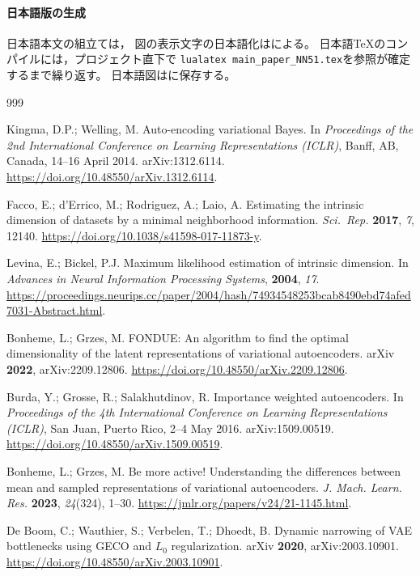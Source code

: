 \documentclass[11pt,a4paper]{ltjsarticle}
\begin{document}
\paragraph{日本語版の生成}
日本語本文の組立ては，
図の表示文字の日本語化はによる。
日本語TeXのコンパイルには，プロジェクト直下で
\texttt{lualatex main\_paper\_NN51.tex}を参照が確定するまで繰り返す。
日本語図はに保存する。


\begin{thebibliography}{999}

Kingma, D.P.; Welling, M.
Auto-encoding variational Bayes.
In \textit{Proceedings of the 2nd International Conference on Learning
Representations (ICLR)}, Banff, AB, Canada, 14--16 April 2014.
arXiv:1312.6114. \url{https://doi.org/10.48550/arXiv.1312.6114}.

Facco, E.; d'Errico, M.; Rodriguez, A.; Laio, A.
Estimating the intrinsic dimension of datasets by a minimal neighborhood
information.
\textit{Sci.\ Rep.} \textbf{2017}, \textit{7}, 12140.
\url{https://doi.org/10.1038/s41598-017-11873-y}.

Levina, E.; Bickel, P.J.
Maximum likelihood estimation of intrinsic dimension.
In \textit{Advances in Neural Information Processing Systems},
\textbf{2004}, \textit{17}.
\url{https://proceedings.neurips.cc/paper/2004/hash/74934548253bcab8490ebd74afed7031-Abstract.html}.

Bonheme, L.; Grzes, M.
FONDUE: An algorithm to find the optimal dimensionality of the latent
representations of variational autoencoders.
arXiv \textbf{2022}, arXiv:2209.12806.
\url{https://doi.org/10.48550/arXiv.2209.12806}.

Burda, Y.; Grosse, R.; Salakhutdinov, R.
Importance weighted autoencoders.
In \textit{Proceedings of the 4th International Conference on Learning
Representations (ICLR)}, San Juan, Puerto Rico, 2--4 May 2016.
arXiv:1509.00519. \url{https://doi.org/10.48550/arXiv.1509.00519}.

Bonheme, L.; Grzes, M.
Be more active! Understanding the differences between mean and sampled
representations of variational autoencoders.
\textit{J. Mach. Learn. Res.} \textbf{2023}, \textit{24}(324), 1--30.
\url{https://jmlr.org/papers/v24/21-1145.html}.

De Boom, C.; Wauthier, S.; Verbelen, T.; Dhoedt, B.
Dynamic narrowing of VAE bottlenecks using GECO and $L_0$ regularization.
arXiv \textbf{2020}, arXiv:2003.10901.
\url{https://doi.org/10.48550/arXiv.2003.10901}.


\end{thebibliography}
\end{document}
